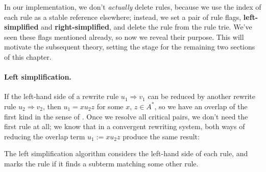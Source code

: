 \documentclass[../generics]{subfiles}
\begin{document}
In our implementation, we don't \emph{actually} delete rules, because we use the index of each rule as a stable reference elsewhere; instead, we set a pair of rule flags, \textbf{left-simplified} and \textbf{right-simplified}, and delete the rule from the rule trie. We've seen these flags mentioned already, so now we reveal their purpose. This will motivate the subsequent theory, setting the stage for the remaining two sections of this chapter.

\paragraph{Left simplification.} If the left-hand side of a rewrite rule $u_1\Rightarrow v_1$ can be reduced by another rewrite rule $u_2\Rightarrow v_2$, then $u_1=xu_2z$ for some $x$, $z\in A^*$, so we have an overlap of the first kind in the sense of . Once we resolve all critical pairs, we don't need the first rule at all; we know that in a convergent rewriting system, both ways of reducing the overlap term $u_1:=xu_2z$ produce the same result:
\begin{center}
\end{center}
The left simplification algorithm considers the left-hand side of each rule, and marks the rule if it finds a subterm matching some other rule.
\end{document}
